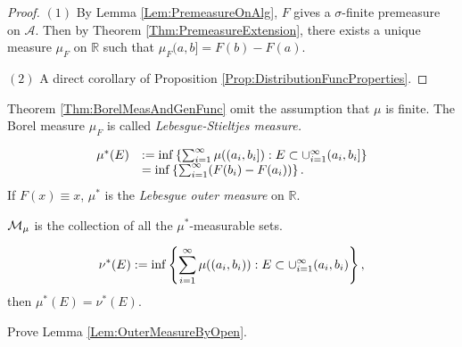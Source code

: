 \begin{proof}
    $(1)$ By Lemma \ref{Lem:PremeasureOnAlg}, $F$ gives a 
    $\sigma$-finite premeasure on $\mathcal{A}$. 
    Then by Theorem \ref{Thm:PremeasureExtension}, there exists a 
    unique measure $\mu_{F}$ on $\mathbb{R}$ such that 
    $\mu_{F}(a,b]=F(b)-F(a)$.

    $(2)$ A direct corollary of Proposition 
    \ref{Prop:DistributionFuncProperties}.
\end{proof}
\begin{rem}
    Theorem \ref{Thm:BorelMeasAndGenFunc} 
    omit the assumption that $\mu$ is finite. 
    The Borel measure $\mu_{F}$ is called 
    \textit{Lebesgue-Stieltjes measure.} 
\end{rem}
\begin{rem}
    \begin{displaymath}
        \begin{array}{rl}
            \mu^{*}(E)&:=\inf\left\{\sum_{i=1}^{\infty}\mu((a_i,b_i]):
            E\subset\cup_{i=1}^{\infty}(a_i,b_i]\right\}\\
            &=\inf\left\{\sum_{i=1}^{\infty}(F(b_i)-F(a_i))\right\}.\\
        \end{array}
    \end{displaymath}
    If $F(x)\equiv x$, $\mu^{*}$ is the \textit{Lebesgue 
    outer measure }on $\mathbb{R}$. 
\end{rem}
\begin{ntn}
    $\mathcal{M}_{\mu}$ is the collection of all the $\mu^{*}$-measurable 
    sets.
\end{ntn}
\begin{lem}
    \label{Lem:OuterMeasureByOpen}
    \begin{displaymath}
        \nu^{*}(E):=\inf\left\{\sum_{i=1}^{\infty}\mu((a_i,b_i)):
        E\subset\cup_{i=1}^{\infty}(a_i,b_i)\right\},
    \end{displaymath}
    then $\mu^{*}(E)=\nu^{*}(E)$.
\end{lem}
\begin{exc}
    Prove Lemma \ref{Lem:OuterMeasureByOpen}.
\end{exc}
